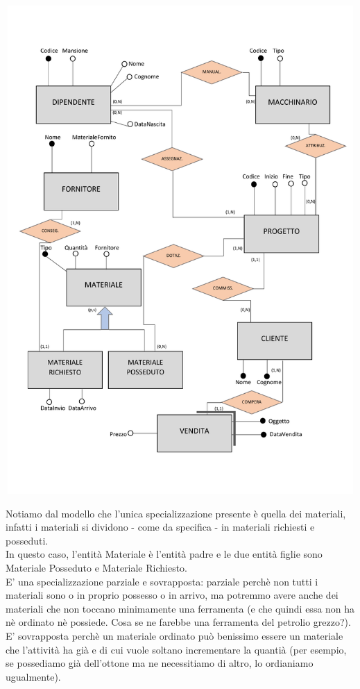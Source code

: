 \documentclass[a4paper,12pt,italian]{article}
\begin{document}
\begin{center}
\includegraphics[width=15cm, height=18.6cm]{diagrammaeravanzato.pdf}
\end{center}
Notiamo dal modello che l'unica specializzazione presente è quella dei materiali, infatti i materiali si dividono - come da specifica - in materiali richiesti e posseduti. \\
In questo caso, l'entità Materiale è l'entità padre e le due entità figlie sono Materiale Posseduto e Materiale Richiesto. \\
E' una specializzazione parziale e sovrapposta: parziale perchè non tutti i materiali sono o in proprio possesso o in arrivo, ma potremmo avere anche dei materiali che non toccano minimamente una ferramenta (e che quindi essa non ha nè ordinato nè possiede. Cosa se ne farebbe una ferramenta del petrolio grezzo?). \\ 
E' sovrapposta perchè un materiale ordinato può benissimo essere un materiale che l'attività ha già e di cui vuole soltano incrementare la quantià (per esempio, se possediamo già dell'ottone ma ne necessitiamo di altro, lo ordianiamo ugualmente).
\end{document}
